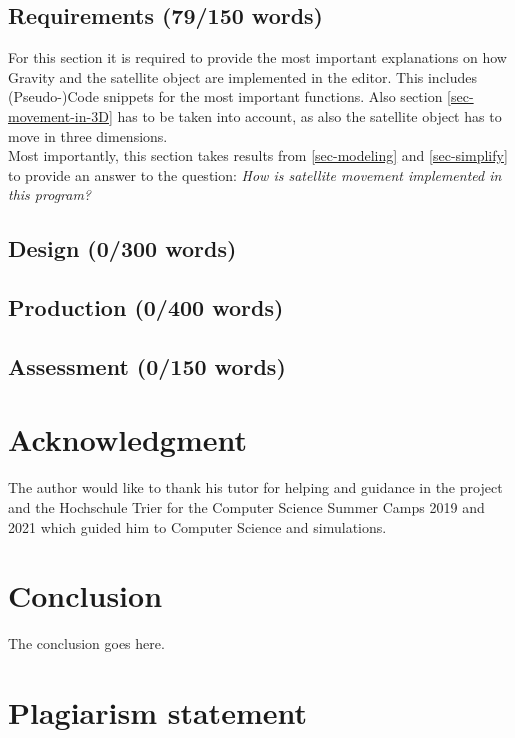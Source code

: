 \documentclass[conference,compsoc]{IEEEtran}
\begin{document}
\subsection{Requirements (79/150 words)}
For this section it is required to provide the most important explanations on how Gravity and the satellite object are implemented in the editor. This includes (Pseudo-)Code snippets for the most important functions. Also section \ref{sec-movement-in-3D} has to be taken into account, as also the satellite object has to move in three dimensions. \\
Most importantly, this section takes results from \ref{sec-modeling} and \ref{sec-simplify} to provide an answer to the question: \emph{How is satellite movement implemented in this program?}
\subsection{Design (0/300 words)}
\subsection{Production (0/400 words)}

\subsection{Assessment (0/150 words)}


\section*{Acknowledgment}
The author would like to thank his tutor for helping and guidance in the project and the Hochschule Trier for the Computer Science Summer Camps 2019 and 2021 which guided him to Computer Science and simulations.


\section{Conclusion}
The conclusion goes here.
\section{Plagiarism statement}
\end{document}
